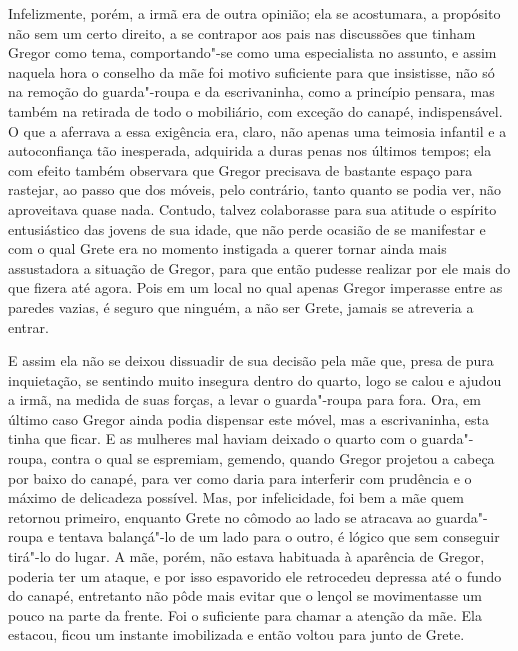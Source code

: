 Infelizmente, porém, a irmã era de outra opinião; ela se acostumara, a
propósito não sem um certo direito, a se contrapor aos pais nas discussões
que tinham Gregor como tema, comportando"-se como uma especialista no
assunto, e assim naquela hora o conselho da mãe foi motivo suficiente para
que insistisse, não só na remoção do guarda"-roupa e da escrivaninha, como
a princípio pensara, mas também na retirada de todo o mobiliário, com
exceção do canapé, indispensável. O que a aferrava a essa exigência era,
claro, não apenas uma teimosia infantil e a autoconfiança tão inesperada,
adquirida a duras penas nos últimos tempos; ela com efeito também
observara que Gregor precisava de bastante espaço para rastejar, ao passo
que dos móveis, pelo contrário, tanto quanto se podia ver, não aproveitava
quase nada. Contudo, talvez colaborasse para sua atitude o espírito
entusiástico das jovens de sua idade, que não perde ocasião de se
manifestar e com o qual Grete era no momento instigada a querer tornar
ainda mais assustadora a situação de Gregor, para que então pudesse
realizar por ele mais do que fizera até agora. Pois em um local no qual
apenas Gregor imperasse entre as paredes vazias, é seguro que ninguém, a
não ser Grete, jamais se atreveria a entrar.

E assim ela não se deixou dissuadir de sua decisão pela mãe que, presa de
pura inquietação, se sentindo muito insegura dentro do quarto, logo se
calou e ajudou a irmã, na medida de suas forças, a levar o guarda"-roupa
para fora. Ora, em último caso Gregor ainda podia dispensar este móvel,
mas a escrivaninha, esta tinha que ficar. E as mulheres mal haviam deixado
o quarto com o guarda"-roupa, contra o qual se espremiam, gemendo, quando
Gregor projetou a cabeça por baixo do canapé, para ver como daria para
interferir com prudência e o máximo de delicadeza possível. Mas, por
infelicidade, foi bem a mãe quem retornou primeiro, enquanto Grete no
cômodo ao lado se atracava ao guarda"-roupa e tentava balançá"-lo de um lado
para o outro, é lógico que sem conseguir tirá"-lo do lugar. A mãe, porém,
não estava habituada à aparência de Gregor, poderia ter um ataque, e por
isso espavorido ele retrocedeu depressa até o fundo do canapé, entretanto
não pôde mais evitar que o lençol se movimentasse um pouco na parte da
frente. Foi o suficiente para chamar a atenção da mãe. Ela estacou, ficou
um instante imobilizada e então voltou para junto de Grete.


